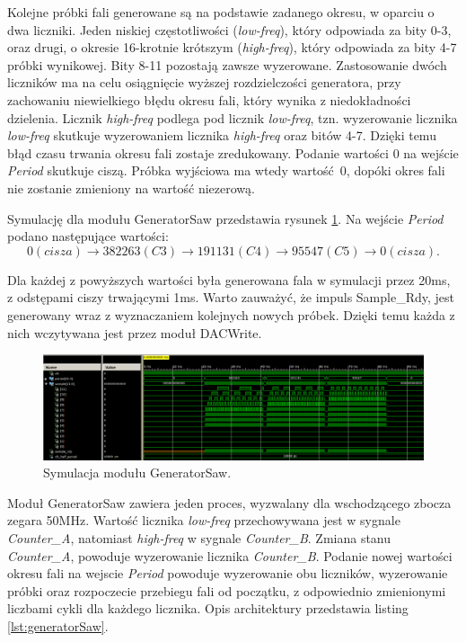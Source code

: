 \documentclass[a4paper,12pt]{article}
\begin{document}
Kolejne próbki fali generowane są na podstawie zadanego okresu, w oparciu o dwa liczniki. Jeden niskiej częstotliwości (\textit{low-freq}), który odpowiada za bity 0-3, oraz drugi, o okresie 16-krotnie krótszym (\textit{high-freq}), który odpowiada za bity 4-7 próbki wynikowej. Bity 8-11 pozostają zawsze wyzerowane. Zastosowanie dwóch liczników ma na celu osiągnięcie wyższej rozdzielczości generatora, przy zachowaniu niewielkiego błędu okresu fali, który wynika z niedokładności dzielenia. Licznik \textit{high-freq} podlega pod licznik \textit{low-freq}, tzn. wyzerowanie licznika \textit{low-freq} skutkuje wyzerowaniem licznika \textit{high-freq} oraz bitów 4-7. Dzięki temu błąd czasu trwania okresu fali zostaje zredukowany.
Podanie wartości 0 na wejście \textit{Period} skutkuje ciszą. Próbka wyjściowa ma wtedy wartość 0, dopóki okres fali nie zostanie zmieniony na wartość niezerową.

Symulację dla modułu GeneratorSaw przedstawia rysunek \ref{sim:gen_saw}. Na wejście \textit{Period} podano następujące wartości:
\begin{equation}
  0 (cisza) \rightarrow 382263 (C3) \rightarrow 191131 (C4) \rightarrow 95547 (C5) \rightarrow 0 (cisza).
\end{equation}

Dla każdej z powyższych wartości była generowana fala w symulacji przez 20ms, z odstępami ciszy trwającymi 1ms. Warto zauważyć, że impuls Sample\_Rdy, jest generowany wraz z wyznaczaniem kolejnych nowych próbek. Dzięki temu każda z nich wczytywana jest przez moduł DACWrite\cite{web:dacwrite}.

\begin{figure}[H]
  \centering
  \includegraphics[decodearray={1 0 1 0 1 0}, width=\linewidth]{images/generator_saw.png}
  \caption{Symulacja modułu GeneratorSaw.}
  \label{sim:gen_saw}
\end{figure}

Moduł GeneratorSaw zawiera jeden proces, wyzwalany dla wschodzącego zbocza zegara 50MHz. Wartość licznika \textit{low-freq} przechowywana jest w sygnale \textit{Counter\_A}, natomiast \textit{high-freq} w sygnale \textit{Counter\_B}. Zmiana stanu \textit{Counter\_A}, powoduje wyzerowanie licznika \textit{Counter\_B}. Podanie nowej wartości okresu fali na wejscie \textit{Period} powoduje wyzerowanie obu liczników, wyzerowanie próbki oraz rozpoczecie przebiegu fali od początku, z odpowiednio zmienionymi liczbami cykli dla każdego licznika.
Opis architektury przedstawia listing \ref{lst:generatorSaw}.
\end{document}
